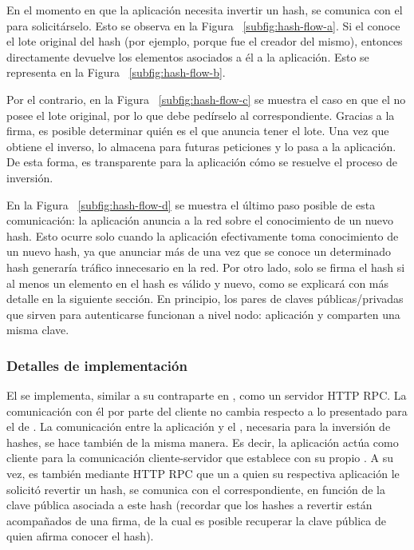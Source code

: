 %
En el momento en que la aplicación necesita invertir un hash, se comunica con el \hcollector
para solicitárselo. Esto se observa en la Figura ~\ref{subfig:hash-flow-a}.
%
Si el \hcollector conoce el lote original del hash (por ejemplo, porque fue el \hcollector creador
del mismo), entonces directamente devuelve los elementos asociados a él a la aplicación.
Esto se representa en la Figura ~\ref{subfig:hash-flow-b}.
%

Por el contrario, en la Figura ~\ref{subfig:hash-flow-c} se muestra el caso en que el \hcollector no posee el lote original,
por lo que debe pedírselo al \hcollector correspondiente. Gracias a la firma, es posible determinar
quién es el \hcollector que anuncia tener el lote. Una vez que obtiene el inverso, lo almacena para
futuras peticiones y lo pasa a la aplicación. De esta forma, es transparente para la aplicación
cómo se resuelve el proceso de inversión.

%

En la Figura ~\ref{subfig:hash-flow-d} se muestra el último paso posible de esta comunicación: la aplicación
anuncia a la red sobre el conocimiento de un nuevo hash. Esto ocurre solo cuando la aplicación
efectivamente toma conocimiento de un nuevo hash, ya que anunciar más de una vez que se conoce un
determinado hash generaría tráfico innecesario en la red.
Por otro lado, solo se firma el hash si al
menos un elemento en el hash es válido y nuevo, como se explicará con más detalle en la siguiente sección.
%
En principio, los pares de claves públicas/privadas que sirven para autenticarse
funcionan a nivel nodo: aplicación y \hcollector comparten una misma clave.

\subsubsection{Detalles de implementación}
El \hcollector se implementa, similar a su contraparte en \compresschain, como un servidor HTTP RPC.
%
La comunicación con él por parte del cliente no cambia respecto a lo presentado para el \collector
de \compresschain.
%
La comunicación entre la aplicación y el \hcollector, necesaria para la inversión de hashes,
se hace también de la misma manera.
Es decir, la aplicación actúa como cliente para la comunicación cliente-servidor que establece con
su propio \hcollector.
%
A su vez, es también mediante HTTP RPC que un \hcollector a quien su respectiva aplicación
le solicitó revertir un hash, se comunica con el \hcollector correspondiente, en función de la clave
pública asociada a este hash (recordar que los hashes a revertir están acompañados de una firma, de la cual
es posible recuperar la clave pública de quien afirma conocer el hash).

